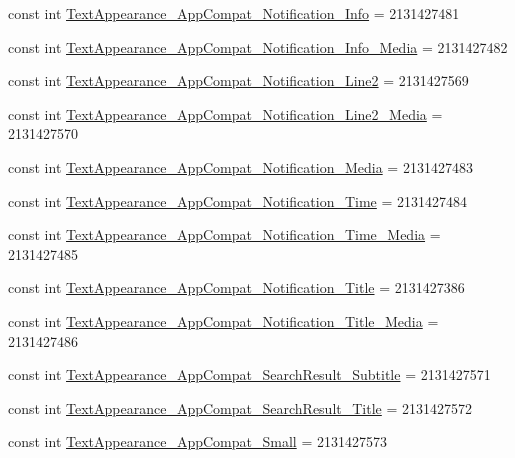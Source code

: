 \begin{CompactItemize}
\item 
const int \hyperlink{class__2doo_1_1_droid_1_1_resource_1_1_style_41c52a4319f92512ba84a2f24bae390b}{TextAppearance\_\-AppCompat\_\-Notification\_\-Info} = 2131427481
\item 
const int \hyperlink{class__2doo_1_1_droid_1_1_resource_1_1_style_2974752fb339ff4f9a9a8f7871a1b9f7}{TextAppearance\_\-AppCompat\_\-Notification\_\-Info\_\-Media} = 2131427482
\item 
const int \hyperlink{class__2doo_1_1_droid_1_1_resource_1_1_style_763550659b3bfe55e894c9dea50b96b7}{TextAppearance\_\-AppCompat\_\-Notification\_\-Line2} = 2131427569
\item 
const int \hyperlink{class__2doo_1_1_droid_1_1_resource_1_1_style_1ecf1e55a576312652b73bf179a7313b}{TextAppearance\_\-AppCompat\_\-Notification\_\-Line2\_\-Media} = 2131427570
\item 
const int \hyperlink{class__2doo_1_1_droid_1_1_resource_1_1_style_6b154e476368f7064c9d567c5cadc4dd}{TextAppearance\_\-AppCompat\_\-Notification\_\-Media} = 2131427483
\item 
const int \hyperlink{class__2doo_1_1_droid_1_1_resource_1_1_style_ca3d4e48ac8d180183d32ab316df917e}{TextAppearance\_\-AppCompat\_\-Notification\_\-Time} = 2131427484
\item 
const int \hyperlink{class__2doo_1_1_droid_1_1_resource_1_1_style_b51d61b39fa6368f11f342f8c0185964}{TextAppearance\_\-AppCompat\_\-Notification\_\-Time\_\-Media} = 2131427485
\item 
const int \hyperlink{class__2doo_1_1_droid_1_1_resource_1_1_style_48bd682066e0f73416e41f8e08486073}{TextAppearance\_\-AppCompat\_\-Notification\_\-Title} = 2131427386
\item 
const int \hyperlink{class__2doo_1_1_droid_1_1_resource_1_1_style_cc6fb2a9b6617f0c86af9d1103b40b27}{TextAppearance\_\-AppCompat\_\-Notification\_\-Title\_\-Media} = 2131427486
\item 
const int \hyperlink{class__2doo_1_1_droid_1_1_resource_1_1_style_3d3203ff90106eed658124462a223e87}{TextAppearance\_\-AppCompat\_\-SearchResult\_\-Subtitle} = 2131427571
\item 
const int \hyperlink{class__2doo_1_1_droid_1_1_resource_1_1_style_340095d867afcd687fd327ebff025489}{TextAppearance\_\-AppCompat\_\-SearchResult\_\-Title} = 2131427572
\item 
const int \hyperlink{class__2doo_1_1_droid_1_1_resource_1_1_style_8d90a7c8d3476b3b33c1390029d8dcf7}{TextAppearance\_\-AppCompat\_\-Small} = 2131427573
\item 

\end{CompactItemize}

